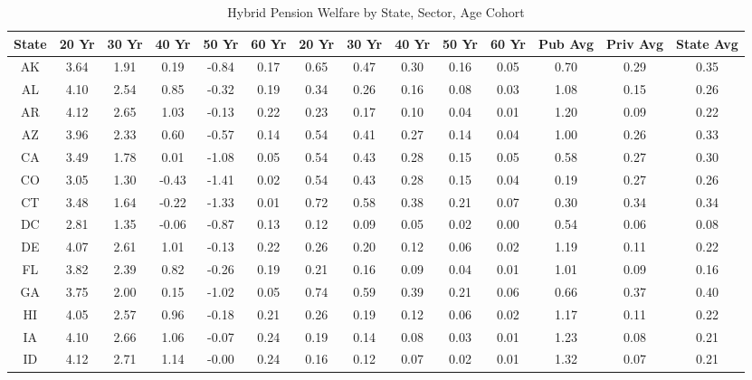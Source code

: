 \begin{table}
\centering
\caption{Hybrid Pension Welfare by State, Sector, Age Cohort}
\label{tab:welfare_hybrid}
\begin{tabular}{cccccccccccccc}
\toprule
State & 20 Yr & 30 Yr & 40 Yr & 50 Yr & 60 Yr & 20 Yr & 30 Yr & 40 Yr & 50 Yr & 60 Yr & Pub Avg & Priv Avg & State Avg \\
\midrule
   AK &  3.64 &  1.91 &  0.19 & -0.84 &  0.17 &  0.65 &  0.47 &  0.30 &  0.16 &  0.05 &    0.70 &     0.29 &      0.35 \\
   AL &  4.10 &  2.54 &  0.85 & -0.32 &  0.19 &  0.34 &  0.26 &  0.16 &  0.08 &  0.03 &    1.08 &     0.15 &      0.26 \\
   AR &  4.12 &  2.65 &  1.03 & -0.13 &  0.22 &  0.23 &  0.17 &  0.10 &  0.04 &  0.01 &    1.20 &     0.09 &      0.22 \\
   AZ &  3.96 &  2.33 &  0.60 & -0.57 &  0.14 &  0.54 &  0.41 &  0.27 &  0.14 &  0.04 &    1.00 &     0.26 &      0.33 \\
   CA &  3.49 &  1.78 &  0.01 & -1.08 &  0.05 &  0.54 &  0.43 &  0.28 &  0.15 &  0.05 &    0.58 &     0.27 &      0.30 \\
   CO &  3.05 &  1.30 & -0.43 & -1.41 &  0.02 &  0.54 &  0.43 &  0.28 &  0.15 &  0.04 &    0.19 &     0.27 &      0.26 \\
   CT &  3.48 &  1.64 & -0.22 & -1.33 &  0.01 &  0.72 &  0.58 &  0.38 &  0.21 &  0.07 &    0.30 &     0.34 &      0.34 \\
   DC &  2.81 &  1.35 & -0.06 & -0.87 &  0.13 &  0.12 &  0.09 &  0.05 &  0.02 &  0.00 &    0.54 &     0.06 &      0.08 \\
   DE &  4.07 &  2.61 &  1.01 & -0.13 &  0.22 &  0.26 &  0.20 &  0.12 &  0.06 &  0.02 &    1.19 &     0.11 &      0.22 \\
   FL &  3.82 &  2.39 &  0.82 & -0.26 &  0.19 &  0.21 &  0.16 &  0.09 &  0.04 &  0.01 &    1.01 &     0.09 &      0.16 \\
   GA &  3.75 &  2.00 &  0.15 & -1.02 &  0.05 &  0.74 &  0.59 &  0.39 &  0.21 &  0.06 &    0.66 &     0.37 &      0.40 \\
   HI &  4.05 &  2.57 &  0.96 & -0.18 &  0.21 &  0.26 &  0.19 &  0.12 &  0.06 &  0.02 &    1.17 &     0.11 &      0.22 \\
   IA &  4.10 &  2.66 &  1.06 & -0.07 &  0.24 &  0.19 &  0.14 &  0.08 &  0.03 &  0.01 &    1.23 &     0.08 &      0.21 \\
   ID &  4.12 &  2.71 &  1.14 & -0.00 &  0.24 &  0.16 &  0.12 &  0.07 &  0.02 &  0.01 &    1.32 &     0.07 &      0.21 \\

\end{tabular}
\end{table}

